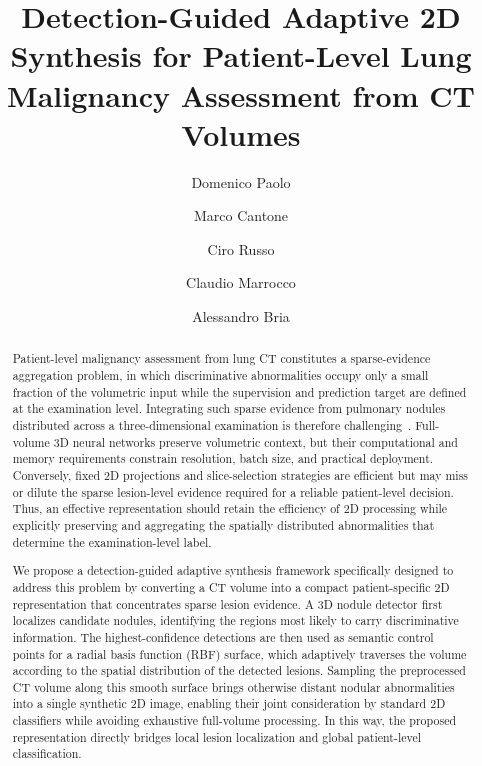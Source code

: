 \documentclass[preprint,12pt]{elsarticle}
\begin{document}
\begin{frontmatter}

\title{Detection-Guided Adaptive 2D Synthesis for Patient-Level Lung Malignancy Assessment from CT Volumes}

\author[1]{Domenico Paolo}
\author[1]{Marco Cantone}
\author[1]{Ciro Russo}
\author[1]{Claudio Marrocco}
\author[1]{Alessandro Bria}



\begin{abstract}
Patient-level malignancy assessment from lung CT constitutes a sparse-evidence aggregation problem, in which discriminative abnormalities occupy only a small fraction of the volumetric input while the supervision and prediction target are defined at the examination level. Integrating such sparse evidence from pulmonary nodules distributed across a three-dimensional examination is therefore challenging~\cite{carbonneau2018multiple}. Full-volume 3D neural networks preserve volumetric context, but their computational and memory requirements constrain resolution, batch size, and practical deployment. Conversely, fixed 2D projections and slice-selection strategies are efficient but may miss or dilute the sparse lesion-level evidence required for a reliable patient-level decision. Thus, an effective representation should retain the efficiency of 2D processing while explicitly preserving and aggregating the spatially distributed abnormalities that determine the examination-level label.

We propose a detection-guided adaptive synthesis framework specifically designed to address this problem by converting a CT volume into a compact patient-specific 2D representation that concentrates sparse lesion evidence. A 3D nodule detector first localizes candidate nodules, identifying the regions most likely to carry discriminative information. The highest-confidence detections are then used as semantic control points for a radial basis function (RBF) surface, which adaptively traverses the volume according to the spatial distribution of the detected lesions. Sampling the preprocessed CT volume along this smooth surface brings otherwise distant nodular abnormalities into a single synthetic 2D image, enabling their joint consideration by standard 2D classifiers while avoiding exhaustive full-volume processing. In this way, the proposed representation directly bridges local lesion localization and global patient-level classification.


\end{abstract}
\end{frontmatter}
\end{document}
